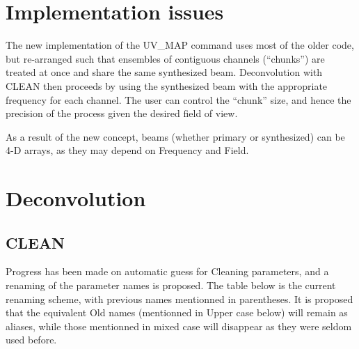 \documentclass[11pt]{article}
\begin{document}
\section{Implementation issues}

The new implementation of the UV\_MAP command uses most of the older code,
but re-arranged such that ensembles of contiguous channels
(``chunks'') are treated at once and share the same synthesized beam.
Deconvolution with CLEAN then proceeds by using the synthesized beam with the
appropriate frequency for each channel. The user can control the
``chunk'' size, and hence the precision of the process given the
desired field of view.

As a result of the new concept, beams (whether primary or synthesized) can be 4-D
arrays, as they may depend on Frequency and Field.

\section{Deconvolution}
 
\subsection{CLEAN}
Progress has been made on automatic guess for Cleaning parameters, and 
a renaming of the parameter names is proposed. The table below is the 
current renaming scheme, with previous names mentionned in 
parentheses. It is proposed that the equivalent Old names 
(mentionned in Upper case below) will remain as aliases, while those
mentionned in mixed case  will disappear as they were seldom used before. 
 
\end{document}
